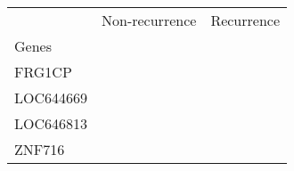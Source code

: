 \begin{tabular}{lcc}
\toprule
{} & Non-recurrence & Recurrence \\
Genes     &                &            \\
\midrule
FRG1CP    &                &            \\
LOC644669 &                &            \\
LOC646813 &                &            \\
ZNF716    &                &            \\
\bottomrule
\end{tabular}
